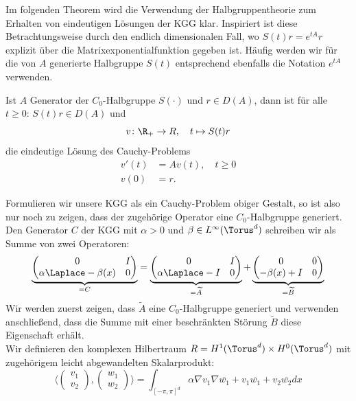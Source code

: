 Im folgenden Theorem wird die Verwendung der Halbgruppentheorie zum Erhalten von eindeutigen Lösungen der KGG klar. Inspiriert ist diese Betrachtungsweise durch den endlich dimensionalen Fall, wo $S(t)r=e^{tA}r$ explizit über die Matrixexponentialfunktion gegeben ist. Häufig werden wir für die von $A$ generierte Halbgruppe $S(t)$ entsprechend ebenfalls die Notation $e^{tA}$ verwenden.
\begin{maththeorem}
Ist $A$ Generator der $C_0$-Halbgruppe $S(\cdot)$ und $r\in D(A)$, dann ist für alle $t\ge 0\colon \,S(t)r\in D(A)$ und
\[v\colon \R_+\to R,\quad t\mapsto S(t)r\]
die eindeutige Lösung des Cauchy-Problems
\begin{equation}
\begin{split}
v'(t)&=Av(t),\quad t\ge 0\\
v(0)&=r.
\end{split}
\end{equation}
\end{maththeorem}
Formulieren wir unsere KGG als ein Cauchy-Problem obiger Gestalt, so ist also nur noch zu zeigen, dass der zugehörige Operator eine $C_0$-Halbgruppe generiert.\\
Den Generator $C$ der KGG mit $\alpha>0$ und $\beta\in L^\infty(\Torus^d)$ schreiben wir als Summe von zwei Operatoren:
\[\underbrace{\begin{pmatrix}0 & I\\ \alpha\Laplace -\beta(x) & 0\end{pmatrix}}_{=C}
=\underbrace{\begin{pmatrix}0 & I\\ \alpha\Laplace-I & 0\end{pmatrix}}_{=\widetilde{A}}
+\underbrace{\begin{pmatrix}0 & 0\\ -\beta(x)+I & 0\end{pmatrix}}_{=\widetilde{B}}\]
Wir werden zuerst zeigen, dass $\widetilde{A}$ eine $C_0$-Halbgruppe generiert und verwenden anschließend, dass die Summe mit einer beschränkten Störung $\widetilde{B}$ diese Eigenschaft erhält.\\[0.2cm]
Wir definieren den komplexen Hilbertraum $R=H^1(\Torus^d)\times H^0(\Torus^d)$ mit zugehörigem leicht abgewandelten Skalarprodukt:
\[\langle \begin{pmatrix}v_1\\v_2\end{pmatrix}, \begin{pmatrix}w_1\\w_2\end{pmatrix}\rangle =\int_{[-\pi,\pi]^d}\alpha \nabla v_1\nabla \overline{w_1}+v_1\overline{w_1}+ v_2\overline{w_2}dx\]
